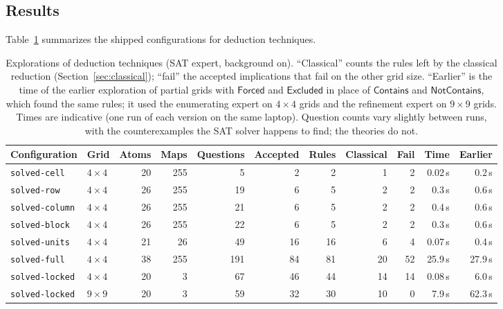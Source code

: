 \documentclass[11pt,a4paper]{article}
\theoremstyle{definition}
\theoremstyle{remark}
\newcommand{\code}[1]{\texttt{#1}}
\newcommand{\pred}[1]{\mathsf{#1}}
\newcommand{\Contains}{\pred{Contains}}
\newcommand{\NotContains}{\pred{NotContains}}
\begin{document}
\subsection{Results}\label{sec:techniques-results}

Table~\ref{tab:techniques} summarizes the shipped configurations for deduction techniques.

\begin{table}[t]
\centering\small
\setlength{\tabcolsep}{4.5pt}
\begin{tabular}{@{}llrrrrrrrrr@{}}
\toprule
Configuration & Grid & Atoms & Maps & Questions & Accepted & Rules & Classical & Fail & Time & Earlier \\
\midrule
\code{solved-cell} & $4\times4$ & 20 & 255 & 5 & 2 & 2 & 1 & 2 & 0.02\,s & 0.2\,s \\
\code{solved-row} & $4\times4$ & 26 & 255 & 19 & 6 & 5 & 2 & 2 & 0.3\,s & 0.6\,s \\
\code{solved-column} & $4\times4$ & 26 & 255 & 21 & 6 & 5 & 2 & 2 & 0.4\,s & 0.6\,s \\
\code{solved-block} & $4\times4$ & 26 & 255 & 22 & 6 & 5 & 2 & 2 & 0.3\,s & 0.6\,s \\
\code{solved-units} & $4\times4$ & 21 & 26 & 49 & 16 & 16 & 6 & 4 & 0.07\,s & 0.4\,s \\
\code{solved-full} & $4\times4$ & 38 & 255 & 191 & 84 & 81 & 20 & 52 & 25.9\,s & 27.9\,s \\
\code{solved-locked} & $4\times4$ & 20 & 3 & 67 & 46 & 44 & 14 & 14 & 0.08\,s & 6.0\,s \\
\code{solved-locked} & $9\times9$ & 20 & 3 & 59 & 32 & 30 & 10 & 0 & 7.9\,s & 62.3\,s \\
\bottomrule
\end{tabular}
\caption{Explorations of deduction techniques (SAT expert, background on). ``Classical'' counts the rules left by the classical reduction (Section~\ref{sec:classical}); ``fail'' the accepted implications that fail on the other grid size. ``Earlier'' is the time of the earlier exploration of partial grids with $\pred{Forced}$ and $\pred{Excluded}$ in place of $\Contains$ and $\NotContains$, which found the same rules; it used the enumerating expert on $4 \times 4$ grids and the refinement expert on $9 \times 9$ grids. Times are indicative (one run of each version on the same laptop). Question counts vary slightly between runs, with the counterexamples the SAT solver happens to find; the theories do not.}
\label{tab:techniques}
\end{table}
\end{document}
